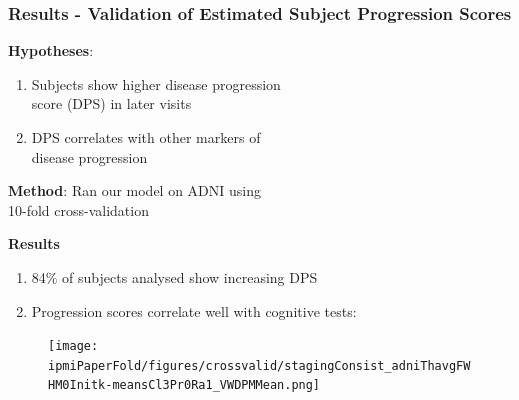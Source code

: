 \documentclass[8pt,xcolor=table]{beamer}
\begin{document}
\begin{frame}
\frametitle{Results - Validation of Estimated Subject Progression Scores}

\textbf{Hypotheses}: 
\begin{enumerate}
 \item Subjects show higher disease progression \\score (DPS) in later visits
 \item DPS correlates with other markers of \\disease progression
\end{enumerate}

\vfill

\textbf{Method}: Ran our model on ADNI using \\10-fold cross-validation

\vfill

\textbf{Results}
\begin{enumerate}
 \item 84\% of subjects analysed show increasing DPS 
 \item Progression scores correlate well with cognitive tests:
\end{enumerate}

\vspace{-16em}
\begin{figure}[h]
  \texttt{[image: \\ipmiPaperFold/figures/crossvalid/stagingConsist\_adniThavgFWHM0Initk-meansCl3Pr0Ra1\_VWDPMMean.png]}
\end{figure}



\newcommand{\figFont}{\small}
\newcommand{\pValFont}{\tiny}


\end{frame}
\end{document}
